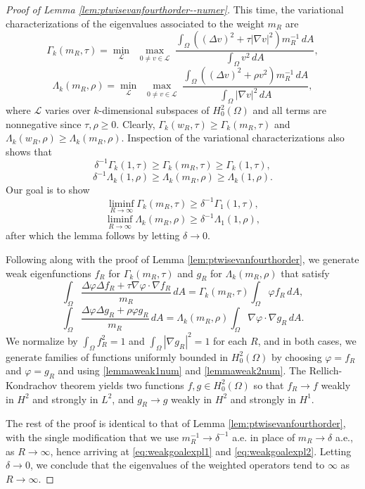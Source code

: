 \documentclass[10pt,a4paper]{amsart}
\newcommand{\grad}{\nabla}
\newcommand{\lapl}{\Delta}
\begin{document}
\begin{proof}[Proof of Lemma \ref{lem:ptwisevanfourthorder--numer}] This time, the variational characterizations of the eigenvalues associated to the weight $m_R$ are
$$
\Gamma_k(m_R, \tau)
= \min_{\mathcal L}\ \max_{\substack{0\neq v\in\mathcal L}}
\frac{\displaystyle \int_{\Omega}\left((\Delta v)^2 + \tau |\nabla v|^2\right)m_R^{-1}\,dA}{\displaystyle \int_{\Omega} v^2\,dA},
$$
$$
\Lambda_k(m_R, \rho)
= \min_{\mathcal L}\ \max_{\substack{0\neq v\in\mathcal L}}
\frac{\displaystyle \int_{\Omega}\left((\Delta v)^2 + \rho v^2\right)m_R^{-1}\,dA}{\displaystyle \int_{\Omega} |\nabla v|^2\,dA},
$$
where $\mathcal{L}$ varies over $k$-dimensional subspaces of $H_0^2(\Omega)$ and all terms are nonnegative since $\tau, \rho \geq 0$. Clearly, $\Gamma_k(w_R,\tau) \geq \Gamma_k(m_R,\tau)$ and $\Lambda_k(w_R,\rho) \geq \Lambda_k(m_R,\rho)$.  Inspection of the variational characterizations also shows that
\begin{equation}\label{lemmaweak1num}
\delta^{-1}\Gamma_k(1, \tau) \geq \Gamma_k(m_R, \tau) \geq \Gamma_k(1, \tau),
\end{equation}
\begin{equation}\label{lemmaweak2num}
\delta^{-1}\Lambda_k(1, \rho) \geq \Lambda_k(m_R, \rho) \geq \Lambda_k(1, \rho).
\end{equation}
Our goal is to show
\begin{equation}\label{eq:weakgoalexpl1}
\liminf_{R \to \infty} \Gamma_k(m_R,\tau)\geq \delta^{-1}\Gamma_1(1,\tau),
\end{equation}
\begin{equation}\label{eq:weakgoalexpl2}
\liminf_{R \to \infty} \Lambda_k(m_R,\rho)\geq \delta^{-1}\Lambda_1(1,\rho),
\end{equation}
after which the lemma follows by letting $\delta \to 0$.

Following along with the proof of Lemma \ref{lem:ptwisevanfourthorder}, we generate weak eigenfunctions $f_R$ for $\Gamma_k(m_R, \tau)$ and $g_R$ for $\Lambda_k(m_R,\rho)$ that satisfy
$$
\int_\Omega \frac{\lapl \varphi \lapl f_R + \tau \grad \varphi \cdot \grad f_R}{m_R}\, dA
= \Gamma_k(m_R, \tau) \int_\Omega \varphi f_R \, dA,
$$
$$
\int_\Omega \frac{\lapl \varphi \lapl g_R + \rho \varphi g_R}{m_R}\, dA
= \Lambda_k(m_R, \rho) \int_\Omega \grad \varphi \cdot \grad g_R \, dA.
$$
We normalize by $\int_\Omega f_R^2 = 1$ and $\int_\Omega |\grad g_R|^2 = 1$ for each $R$, and in both cases, we generate families of functions uniformly bounded in $H_0^2(\Omega)$ by choosing $\varphi = f_R$ and $\varphi = g_R$ and using \eqref{lemmaweak1num} and \eqref{lemmaweak2num}. The Rellich-Kondrachov theorem yields two functions $f,g \in H_0^2(\Omega)$ so that $f_R \to f$ weakly in $H^2$ and strongly in $L^2$, and $g_R \to g$ weakly in $H^2$ and strongly in $H^1$.

The rest of the proof is identical to that of Lemma \ref{lem:ptwisevanfourthorder}, with the single modification that we use $m_R^{-1}\to \delta^{-1}$ a.e. in place of $m_R \to \delta$ a.e., as $R \to \infty$, hence arriving at \eqref{eq:weakgoalexpl1} and \eqref{eq:weakgoalexpl2}. Letting $\delta \to 0$, we conclude that the eigenvalues of the weighted operators tend to $\infty$ as $R \to \infty$.
\end{proof}
\end{document}
